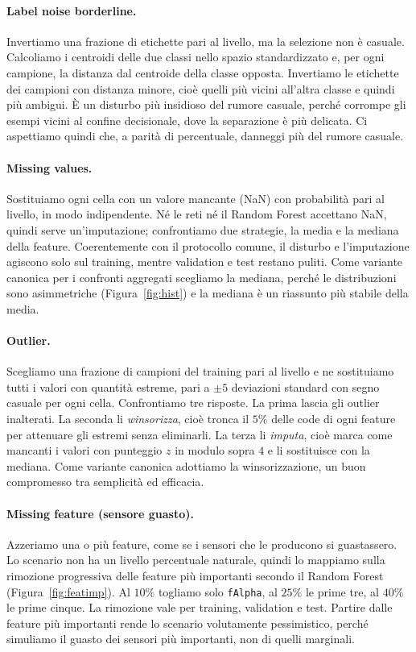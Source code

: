 \documentclass[12pt,a4paper]{article}
\begin{document}
\paragraph{Label noise borderline.} Invertiamo una frazione di etichette pari al livello, ma la
selezione non è casuale. Calcoliamo i centroidi delle due classi nello spazio standardizzato e, per
ogni campione, la distanza dal centroide della classe opposta. Invertiamo le etichette dei campioni con
distanza minore, cioè quelli più vicini all'altra classe e quindi più ambigui. È un disturbo più
insidioso del rumore casuale, perché corrompe gli esempi vicini al confine decisionale, dove la
separazione è più delicata. Ci aspettiamo quindi che, a parità di percentuale, danneggi più del rumore
casuale.

\paragraph{Missing values.} Sostituiamo ogni cella con un valore mancante (NaN) con probabilità pari al
livello, in modo indipendente. Né le reti né il Random Forest accettano NaN, quindi serve
un'imputazione; confrontiamo due strategie, la media e la mediana della feature. Coerentemente con il
protocollo comune, il disturbo e l'imputazione agiscono solo sul training, mentre validation e test
restano puliti. Come variante canonica per i confronti aggregati scegliamo la mediana, perché le
distribuzioni sono asimmetriche (Figura~\ref{fig:hist}) e la mediana è un riassunto più stabile della
media.

\paragraph{Outlier.} Scegliamo una frazione di campioni del training pari al livello e ne sostituiamo
tutti i valori con quantità estreme, pari a $\pm 5$ deviazioni standard con segno casuale per ogni
cella. Confrontiamo tre risposte. La prima lascia gli outlier inalterati. La seconda li
\emph{winsorizza}, cioè tronca il $5\%$ delle code di ogni feature per attenuare gli estremi senza
eliminarli. La terza li \emph{imputa}, cioè marca come mancanti i valori con punteggio $z$ in modulo
sopra $4$ e li sostituisce con la mediana. Come variante canonica adottiamo la winsorizzazione, un buon
compromesso tra semplicità ed efficacia.

\paragraph{Missing feature (sensore guasto).} Azzeriamo una o più feature, come se i sensori che le
producono si guastassero. Lo scenario non ha un livello percentuale naturale, quindi lo mappiamo sulla
rimozione progressiva delle feature più importanti secondo il Random Forest (Figura~\ref{fig:featimp}).
Al $10\%$ togliamo solo \texttt{fAlpha}, al $25\%$ le prime tre, al $40\%$ le prime cinque. La rimozione
vale per training, validation e test. Partire dalle feature più importanti rende lo scenario volutamente
pessimistico, perché simuliamo il guasto dei sensori più importanti, non di quelli marginali.
\end{document}
